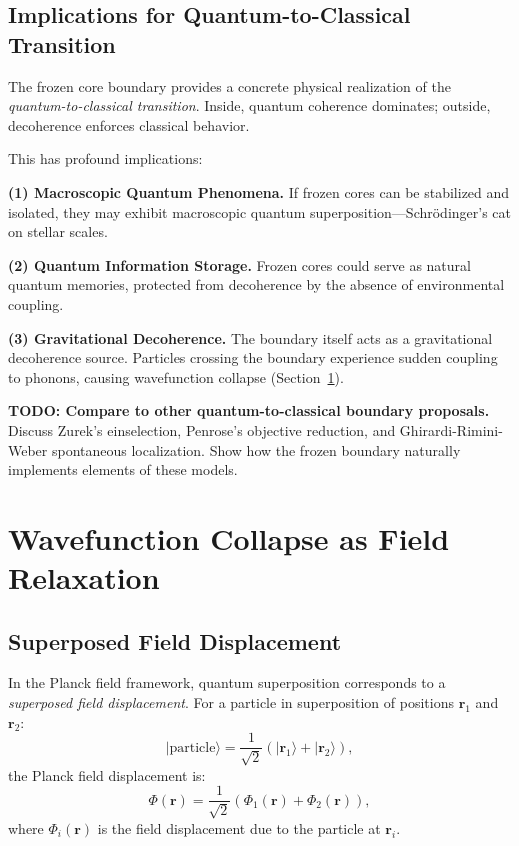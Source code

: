 \documentclass[11pt,a4paper]{article}
\newcommand{\psiket}[1]{\ensuremath{|#1\rangle}}
\theoremstyle{definition}
\theoremstyle{remark}
\begin{document}
\subsection{Implications for Quantum-to-Classical Transition}
\label{sec:quantum_classical_transition}

The frozen core boundary provides a concrete physical realization of the \emph{quantum-to-classical transition}. Inside, quantum coherence dominates; outside, decoherence enforces classical behavior.

This has profound implications:

\textbf{(1) Macroscopic Quantum Phenomena.} If frozen cores can be stabilized and isolated, they may exhibit macroscopic quantum superposition---Schr\"odinger's cat on stellar scales.

\textbf{(2) Quantum Information Storage.} Frozen cores could serve as natural quantum memories, protected from decoherence by the absence of environmental coupling.

\textbf{(3) Gravitational Decoherence.} The boundary itself acts as a gravitational decoherence source. Particles crossing the boundary experience sudden coupling to phonons, causing wavefunction collapse (Section~\ref{sec:wavefunction_collapse}).

\textbf{TODO: Compare to other quantum-to-classical boundary proposals.} Discuss Zurek's einselection, Penrose's objective reduction, and Ghirardi-Rimini-Weber spontaneous localization. Show how the frozen boundary naturally implements elements of these models.

\section{Wavefunction Collapse as Field Relaxation}
\label{sec:wavefunction_collapse}

\subsection{Superposed Field Displacement}
\label{sec:superposed_displacement}

In the Planck field framework, quantum superposition corresponds to a \emph{superposed field displacement}. For a particle in superposition of positions $\mathbf{r}_1$ and $\mathbf{r}_2$:
\begin{equation}
\label{eq:superposed_position}
\psiket{\text{particle}} = \frac{1}{\sqrt{2}}\left(\psiket{\mathbf{r}_1} + \psiket{\mathbf{r}_2}\right),
\end{equation}
the Planck field displacement is:
\begin{equation}
\label{eq:superposed_field}
\Phi(\mathbf{r}) = \frac{1}{\sqrt{2}}\left(\Phi_1(\mathbf{r}) + \Phi_2(\mathbf{r})\right),
\end{equation}
where $\Phi_i(\mathbf{r})$ is the field displacement due to the particle at $\mathbf{r}_i$.
\end{document}
